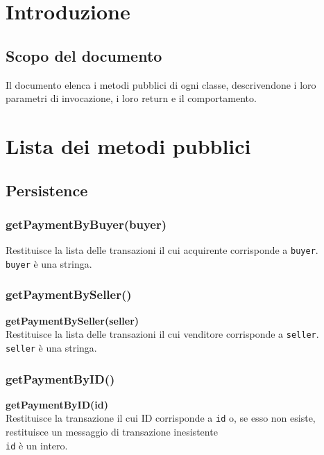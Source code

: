 \documentclass[a4paper, 12pt]{article}
\begin{document}
\makefrontpage

\makeversioni

\section{Introduzione}
\subsection{Scopo del documento}
Il documento elenca i metodi pubblici di ogni classe, descrivendone i loro parametri di invocazione, i loro return e il comportamento.

\section{Lista dei metodi pubblici}
\subsection{Persistence}


\subsubsection{getPaymentByBuyer(buyer)}
Restituisce la lista delle transazioni il cui acquirente corrisponde a \texttt{buyer}. \\
\texttt{buyer} è una stringa.

\subsubsection{getPaymentBySeller()}
\textbf{getPaymentBySeller(seller)} \\
Restituisce la lista delle transazioni il cui venditore corrisponde a \texttt{seller}. \\
\texttt{seller} è una stringa.

\subsubsection{getPaymentByID()}
\textbf{getPaymentByID(id)} \\
Restituisce la transazione il cui ID corrisponde a \texttt{id} o, se esso non esiste, restituisce un messaggio di transazione inesistente \\
\texttt{id} è un intero.
\end{document}
